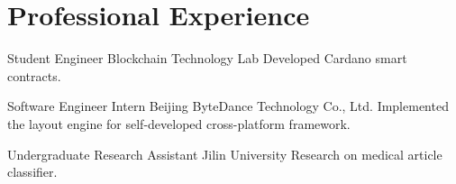 \section{Professional Experience}

{Student Engineer}
{Blockchain Technology Lab}
{}
{}
{Developed Cardano smart contracts.}

{Software Engineer Intern}
{Beijing ByteDance Technology Co., Ltd.}
{}
{}
{Implemented the layout engine for self-developed cross-platform framework.}

{Undergraduate Research Assistant}
{Jilin University}
{}
{}
{Research on medical article classifier.}
